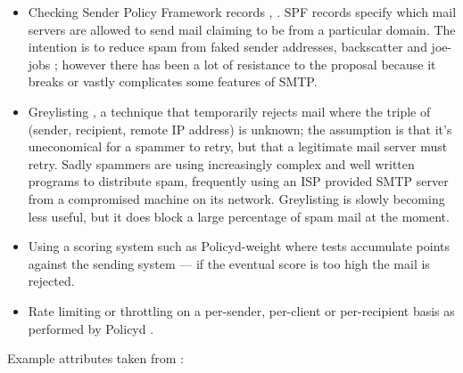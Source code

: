 \documentclass[a4paper,12pt,draft]{article}
\begin{document}
\begin{itemize}

    \item Checking Sender Policy Framework records \cite{openspf},
        \cite{wikipedia-spf}.  SPF records specify which mail servers are
        allowed to send mail claiming to be from a particular domain.  The
        intention is to reduce spam from faked sender addresses,
        backscatter \cite{postfix-backscatter} and joe-jobs
        \cite{wikipedia-joe-job}; however there
        has been a lot of resistance to the proposal because it breaks or
        vastly complicates some features of SMTP.

    \item Greylisting \cite{greylisting}, a technique that temporarily
        rejects mail where the triple of (sender, recipient, remote IP
        address) is unknown; the assumption is that it's uneconomical for a
        spammer to retry, but that a legitimate mail server must retry.
        Sadly spammers are using increasingly complex and well written
        programs to distribute spam, frequently using an ISP provided SMTP
        server from a compromised machine on its network.  Greylisting is
        slowly becoming less useful, but it does block a large percentage
        of spam mail at the moment.

    \item Using a scoring system such as Policyd-weight
        \cite{policyd-weight} where tests accumulate points against the
        sending system --- if the eventual score is too high the mail is
        rejected.
        
    \item Rate limiting or throttling on a per-sender, per-client or
        per-recipient basis as performed by Policyd \cite{policyd}.

\end{itemize}

Example attributes taken from \cite{policy-servers}:
\end{document}

